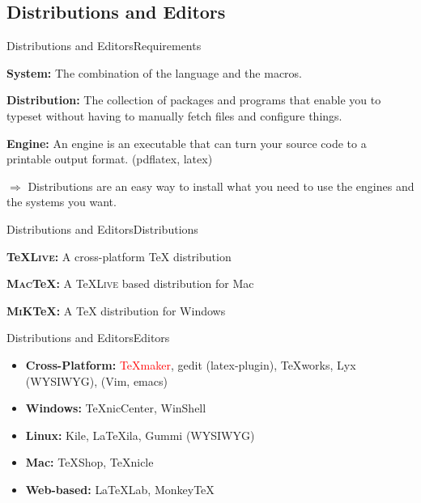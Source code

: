 \documentclass[xcolor={dvipsnames}]{beamer}
\begin{document}
\subsection{Distributions and Editors}
\begin{frame}{Distributions and Editors}{Requirements}

\textbf{System:} The combination of the language and the macros. 
 
\textbf{Distribution:} The collection of packages and programs that enable you to typeset without having to manually fetch files and configure things.

\textbf{Engine:} An engine is an executable that can turn your source code to a printable output format. (pdflatex, latex) %


$\Rightarrow$ Distributions are an easy way to install what you need to use the engines and the systems you want.

\end{frame}
\begin{frame}{Distributions and Editors}{Distributions}


\textbf{{\TeX}\textsc{Live}:} A  cross-platform {\TeX} distribution

\textbf{\textsc{Mac}{\TeX}:} A {\TeX}\textsc{Live} based distribution for Mac

\textbf{\textsc{MiK}{\TeX}:} A {\TeX} distribution for Windows


\end{frame}
\begin{frame}{Distributions and Editors}{Editors}
\begin{itemize}
\setlength{\parskip}{0.2cm}
\item \textbf{Cross-Platform:} \textcolor{red}{{\TeX}maker}, gedit (latex-plugin), {\TeX}works, Lyx (WYSIWYG), (Vim, emacs)
\item \textbf{Windows:} {\TeX}nicCenter, WinShell
\item \textbf{Linux:} Kile, {\LaTeX}ila, Gummi (WYSIWYG)
\item \textbf{Mac:} {\TeX}Shop,  {\TeX}nicle
\item \textbf{Web-based:}  {\LaTeX}Lab, Monkey{\TeX}
\end{itemize}
\end{frame}
\end{document}
